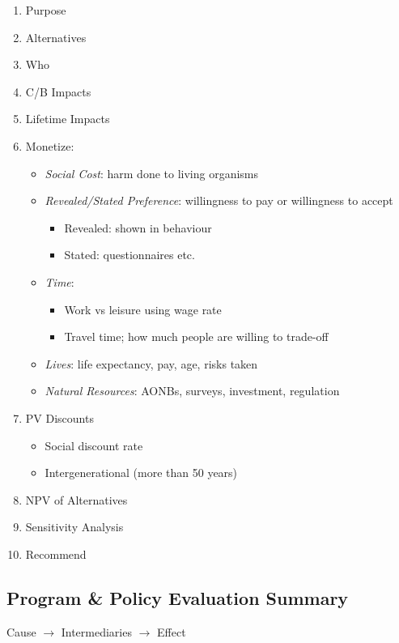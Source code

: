 \documentclass[11pt, english]{article}
\begin{document}
	\begin{enumerate}
	\setlength\itemsep{0cm}
		\item Purpose
		\item Alternatives
		\item Who
		\item C/B Impacts
		\item Lifetime Impacts
		\item Monetize:
		\begin{itemize}
			\item \textit{Social Cost}: harm done to living organisms
			\item \textit{Revealed/Stated Preference}: willingness to pay or willingness to accept
			\begin{itemize}
				\item Revealed: shown in behaviour
				\item Stated: questionnaires etc.
			\end{itemize}
			\item \textit{Time}:
			\begin{itemize}
				\item Work vs leisure using wage rate 
				\item Travel time; how much people are willing to trade-off
			\end{itemize}
			\item \textit{Lives}: life expectancy, pay, age, risks taken
			\item \textit{Natural Resources}: AONBs, surveys, investment, regulation
		\end{itemize}
		\item PV Discounts
		\begin{itemize}
			\item Social discount rate
			\item Intergenerational (more than 50 years)
		\end{itemize}
		\item NPV of Alternatives
		\item Sensitivity Analysis
		\item Recommend
	\end{enumerate}

	\newpage

	\subsection{Program \& Policy Evaluation Summary}

	\begin{center}Cause $\longrightarrow$ Intermediaries $\longrightarrow$ Effect\end{center}
\end{document}

